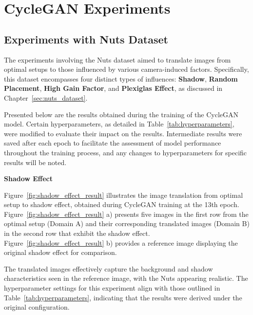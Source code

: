 \documentclass[12pt,DIV14,BCOR12mm,a4paper,footinclude=false,headinclude,parskip=half-,twoside,openright,cleardoublepage=empty,toc=index,bibliography=totoc,listof=totoc]{scrreprt}
\numberwithin{equation}{chapter}
\begin{document}
\section{CycleGAN Experiments}

\subsection{Experiments with Nuts Dataset}
\label{sec:cyclegan_nuts}
The experiments involving the Nuts dataset aimed to translate images from optimal setups to those influenced by various camera-induced factors. Specifically, this dataset encompasses four distinct types of influences: \textbf{Shadow}, \textbf{Random Placement}, \textbf{High Gain Factor}, and \textbf{Plexiglas Effect}, as discussed in Chapter~\ref{sec:nuts_dataset}.

Presented below are the results obtained during the training of the CycleGAN model. Certain hyperparameters, as detailed in Table~\ref{tab:hyperparameters}, were modified to evaluate their impact on the results. Intermediate results were saved after each epoch to facilitate the assessment of model performance throughout the training process, and any changes to hyperparameters for specific results will be noted.

\textbf{Shadow Effect}

Figure~\ref{fig:shadow_effect_result} illustrates the image translation from optimal setup to shadow effect, obtained during CycleGAN training at the 13th epoch. Figure~\ref{fig:shadow_effect_result} a) presents five images in the first row from the optimal setup (Domain A) and their corresponding translated images (Domain B) in the second row that exhibit the shadow effect. Figure~\ref{fig:shadow_effect_result} b) provides a reference image displaying the original shadow effect for comparison.

The translated images effectively capture the background and shadow characteristics seen in the reference image, with the Nuts appearing realistic. The hyperparameter settings for this experiment align with those outlined in Table~\ref{tab:hyperparameters}, indicating that the results were derived under the original configuration.
\end{document}
